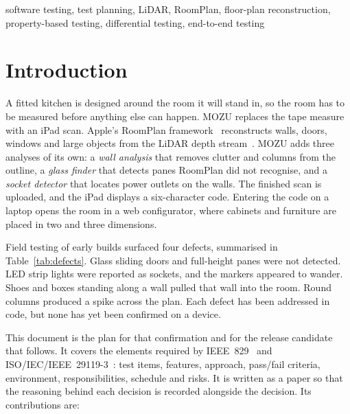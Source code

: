 \documentclass[conference,a4paper,10pt]{IEEEtran}
\begin{document}
\begin{IEEEkeywords}
software testing, test planning, LiDAR, RoomPlan, floor-plan reconstruction,
property-based testing, differential testing, end-to-end testing
\end{IEEEkeywords}

\section{Introduction}

A fitted kitchen is designed around the room it will stand in, so the room
has to be measured before anything else can happen. MOZU replaces the tape
measure with an iPad scan. Apple's RoomPlan framework~\cite{roomplan}
reconstructs walls, doors, windows and large objects from the LiDAR depth
stream~\cite{ardepth}. MOZU adds three analyses of its own: a \emph{wall
analysis} that removes clutter and columns from the outline, a \emph{glass
finder} that detects panes RoomPlan did not recognise, and a \emph{socket
detector} that locates power outlets on the walls. The finished scan is
uploaded, and the iPad displays a six-character code. Entering the code on a
laptop opens the room in a web configurator, where cabinets and furniture are
placed in two and three dimensions.

Field testing of early builds surfaced four defects, summarised in
Table~\ref{tab:defects}. Glass sliding doors and full-height panes were not
detected. LED strip lights were reported as sockets, and the markers appeared
to wander. Shoes and boxes standing along a wall pulled that wall into the
room. Round columns produced a spike across the plan. Each defect has been
addressed in code, but none has yet been confirmed on a device.

This document is the plan for that confirmation and for the release candidate
that follows. It covers the elements required by IEEE~829~\cite{ieee829} and
ISO/IEC/IEEE~29119-3~\cite{iso29119}: test items, features, approach,
pass/fail criteria, environment, responsibilities, schedule and risks. It is
written as a paper so that the reasoning behind each decision is recorded
alongside the decision. Its contributions are:
\end{document}
